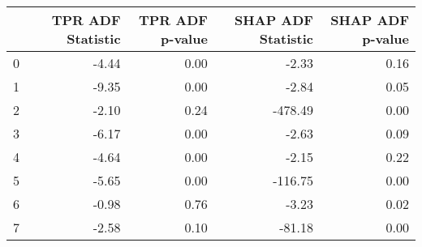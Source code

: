 \begin{tabular}{lrrrr}
\toprule
 & TPR ADF Statistic & TPR ADF p-value & SHAP ADF Statistic & SHAP ADF p-value \\
\midrule
0 & -4.44 & 0.00 & -2.33 & 0.16 \\
1 & -9.35 & 0.00 & -2.84 & 0.05 \\
2 & -2.10 & 0.24 & -478.49 & 0.00 \\
3 & -6.17 & 0.00 & -2.63 & 0.09 \\
4 & -4.64 & 0.00 & -2.15 & 0.22 \\
5 & -5.65 & 0.00 & -116.75 & 0.00 \\
6 & -0.98 & 0.76 & -3.23 & 0.02 \\
7 & -2.58 & 0.10 & -81.18 & 0.00 \\
\bottomrule
\end{tabular}
